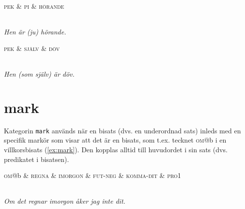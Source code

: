 \documentclass[11pt,a4paper]{article}
\begin{document}
\begin{example}
\label{ex:cop_pi}
\begin{dependency}[theme = simple]
   \begin{deptext}[column sep=1em]
      \textsc{pek} \& \textsc{pi} \& \textsc{hörande} \\
   \end{deptext}
\end{dependency}
\\
\textit{Hen är (ju) hörande.}
\end{example}

\begin{example}
\label{ex:cop_refl}
\begin{dependency}[theme = simple]
   \begin{deptext}[column sep=1em]
      \textsc{pek} \& \textsc{själv} \& \textsc{döv} \\
   \end{deptext}
\end{dependency}
\\
\textit{Hen (som själv) är döv.}
\end{example}

\section{mark}
Kategorin \texttt{mark} används när en bisats (dvs. en underordnad sats) inleds med en specifik markör som visar att det är en bisats, som t.ex. tecknet \textsc{om}@b
i en villkorsbisats (\ref{ex:mark}). Den kopplas alltid till huvudordet i sin sats (dvs. predikatet i bisatsen).

\begin{example}
\label{ex:mark}
\begin{dependency}[theme = simple]
   \begin{deptext}[column sep=1em]
      \textsc{om}@b \& \textsc{regna} \& \textsc{imorgon} \& \textsc{fut-neg} \& \textsc{komma-dit} \& \textsc{pro1}  \\
   \end{deptext}
\end{dependency}
\\
\textit{Om det regnar imorgon åker jag inte dit.}
\end{example}
\end{document}
